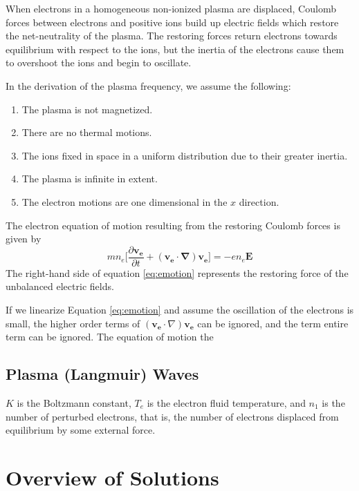 \documentclass[twocolumn]{article}
\begin{document}
When electrons in a homogeneous non-ionized plasma are displaced, Coulomb forces between electrons and positive ions build up electric fields which restore the net-neutrality of the plasma.
The restoring forces return electrons towards equilibrium with respect to the ions, but the inertia of the electrons cause them to overshoot the ions and begin to oscillate.

In the derivation of the plasma frequency, we assume the following:
\begin{enumerate}
	\item The plasma is not magnetized.
	\item There are no thermal motions.
	\item The ions fixed in space in a uniform distribution due to their greater inertia.
	\item The plasma is infinite in extent.
	\item The electron motions are one dimensional in the $x$ direction.
\end{enumerate}

The electron equation of motion resulting from the restoring Coulomb forces is given by
\begin{equation} \label{eq:emotion}
	mn_e \lbrack \frac{\partial \mathbf{v_e}}{\partial t} + \left( \mathbf{v_e} \cdot \mathbf{\nabla} \right) \mathbf{v_e} \rbrack = -en_e\mathbf{E}
\end{equation}
The right-hand side of equation \ref{eq:emotion} represents the restoring force of the unbalanced electric fields.

If we linearize Equation \ref{eq:emotion} and assume the oscillation of the electrons is small, the higher order terms of $\left(\mathbf{v_e} \cdot \nabla \right) \mathbf{v_e}$ can be ignored, and the term entire term can be ignored.
The equation of motion the

\subsection*{Plasma (Langmuir) Waves}
$K$ is the Boltzmann constant, $T_e$ is the electron fluid temperature, and $n_1$ is the number of perturbed electrons, that is, the number of electrons displaced from equilibrium by some external force.



\section{Overview of Solutions} \label{sec:Overview}
\end{document}
